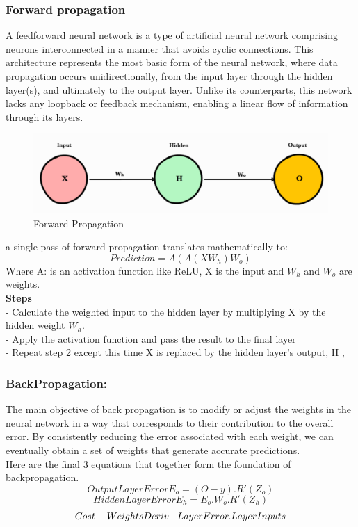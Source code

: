 \subsubsection{Forward propagation}

A feedforward neural network is a type of artificial neural network comprising neurons interconnected in a manner that avoids cyclic connections. This architecture represents the most basic form of the neural network, where data propagation occurs unidirectionally, from the input layer through the hidden layer(s), and ultimately to the output layer. Unlike its counterparts, this network lacks any loopback or feedback mechanism, enabling a linear flow of information through its layers. \cite{coates2011analysis} \cite{ansari2020building} 
\begin{figure}[H]
    \centering
    \includegraphics[width=0.7\linewidth]{tex/img/Forwardpropagation.PNG}
    \caption{Forward Propagation \cite{ajitjaokar}}
    \label{fig:enter-label}
\end{figure}
a single pass of forward propagation translates mathematically to:
\[Prediction=A(A(XW_{h})W_{o})\]
Where A:    is an activation function like ReLU, X is the input and $W_{h}$ and $W_{o}$ are weights.\\

\textbf{Steps}\\
- Calculate the weighted input to the hidden layer by multiplying X by the hidden weight $W_{h}$.\\
- Apply the activation function and pass the result to the final layer \\
- Repeat step 2 except this time X is replaced by the hidden layer’s output, H \cite{ansari2020building}, \cite{nielsen2015neural}

\subsubsection{BackPropagation: }
The main objective of back propagation is to modify or adjust the weights in the neural network in a way that corresponds to their contribution to the overall error. By consistently reducing the error associated with each weight, we can eventually obtain a set of weights that generate accurate predictions. \\
Here are the final 3 equations that together form the foundation of backpropagation. \cite{hecht1992theory} \cite{nielsen2015neural}
 \[
 Output Layer Error    E_{o} = (O-y).R'(Z_{o})
 \]
 \[ 
 Hidden Layer Error    E_{h} = E_{o}.W_{o}.R'(Z_{h})
 \]
 \[ 
 Cost-Weights Deriv \hspace{3mm}   LayerError.LayerInputs
 \]


